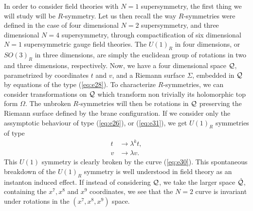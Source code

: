In order to consider field theories with $N=1$ supersymmetry, the
first thing we will study will be $R$-symmetry. Let us then
recall the way $R$-symmetries were defined in the case of four
dimensional $N=2$ supersymmetry, and three dimensional $N=4$
supersymmetry, through compactification of six dimensional $N=1$
supersymmetric gauge field theories. The $U(1)_R$ in four
dimensions, or $SO(3)_R$ in three dimensions, are simply the
euclidean group of rotations in two and three dimensions,
respectively. Now, we have a four dimensional space ${\cal Q}$,
parametrized by coordinates $t$ and $v$, and a Riemann surface
$\Sigma$, embedded in ${\cal Q}$ by equations of the type
(\ref{eq:e28}). To characterize $R$-symmetries, we can consider
transformations on ${\cal Q}$ which transform non trivially its
holomorphic top form $\Omega$. The unbroken $R$-symmetries will
then be rotations in ${\cal Q}$ preserving the Riemann surface
defined by the brane configuration. If we consider only the
assymptotic behaviour of type (\ref{eq:e26}), or (\ref{eq:e31}),
we get $U(1)_R$ symmetries of type 
\begin{eqnarray}
t & \rightarrow \lambda^k t, \nonumber \\
v & \rightarrow \lambda v. 
\label{eq:e35}
\end{eqnarray}
This $U(1)$ symmetry is clearly broken by the curve
(\ref{eq:e30}). This spontaneous breakdown of the $U(1)_R$
symmetry is well understood in field theory as an instanton
induced effect. If instead of considering ${\cal Q}$, we take the
larger space $\hat{\cal Q}$, containing the $x^7,x^8$ and $x^9$
coordinates, we see that the $N=2$ curve is invariant under
rotations in the $(x^7,x^8,x^9)$ space.
  
